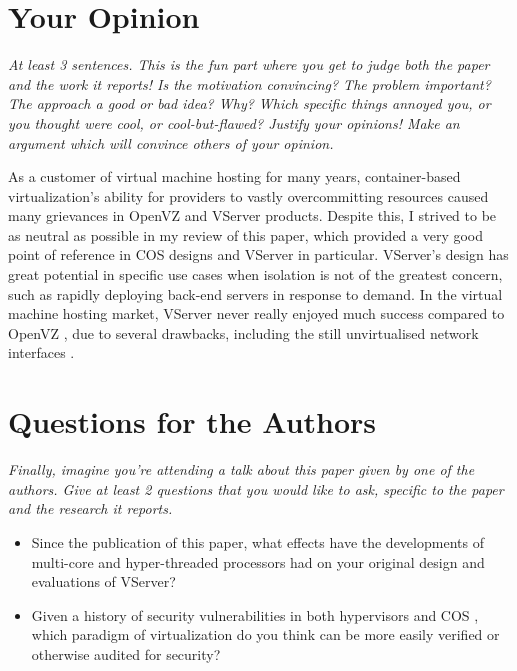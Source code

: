 \documentclass[11pt]{article}
\begin{document}
\section*{Your Opinion}
\textsl{At least 3 sentences. This is the fun part where you get to judge both the paper and the work it reports! Is the motivation convincing? The problem important? The approach a good or bad idea?  Why? Which specific things annoyed you, or you thought were cool, or cool-but-flawed? Justify your opinions! Make an argument which will convince others of your opinion.}

As a customer of virtual machine hosting for many years, container-based virtualization's ability for providers to vastly overcommitting resources caused many grievances in OpenVZ and VServer products. Despite this, I strived to be as neutral as possible in my review of this paper, which provided a very good point of reference in COS designs and VServer in particular. VServer's design has great potential in specific use cases when isolation is not of the greatest concern, such as rapidly deploying back-end servers in response to demand. In the virtual machine hosting market, VServer never really enjoyed much success compared to OpenVZ \cite{zhou2015comparison}, due to several drawbacks, including the still unvirtualised network interfaces \cite{vservernetwork}.

\section*{Questions for the Authors}
\textsl{Finally, imagine you're attending a talk about this paper given by one of the authors. Give at least 2 questions that you would like to ask, specific to the paper and the research it reports.}

\begin{itemize}
	\item Since the publication of this paper, what effects have the developments of multi-core and hyper-threaded processors had on your original design and evaluations of VServer?
	\item Given a history of security vulnerabilities in both hypervisors and COS \cite{costan2017secure}, which paradigm of virtualization do you think can be more easily verified or otherwise audited for security?
\end{itemize}


\footnotesize{}
\end{document}
